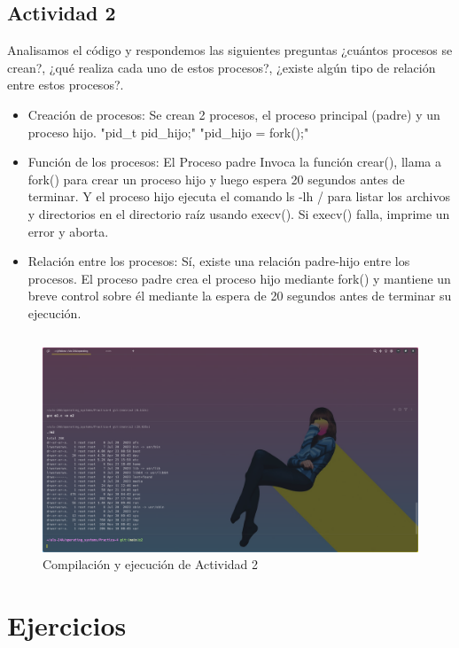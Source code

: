 \documentclass{article}
\newenvironment{code}{\captionsetup{type=listing}}{}
\begin{document}
\subsection{Actividad 2}
Analisamos el código y respondemos las siguientes preguntas ¿cuántos 
procesos se crean?, ¿qué realiza cada uno de estos procesos?, ¿existe 
algún tipo de relación entre estos procesos?.
    \begin{itemize}
        \item Creación de procesos: Se crean 2 procesos, el proceso 
		principal (padre) y un proceso hijo. "pid\_t pid\_hijo;" 
		"pid\_hijo = fork();"
        \item Función de los procesos: El Proceso padre Invoca la 
		función crear(), llama a fork() para crear un proceso hijo 
		y luego espera 20 segundos antes de terminar. Y el proceso 
		hijo ejecuta el comando ls -lh / para listar los archivos 
		y directorios en el directorio raíz usando execv(). Si execv()
		 falla, imprime un error y aborta.
        \item Relación entre los procesos: Sí, existe una relación 
		padre-hijo entre los procesos. El proceso padre crea el 
		proceso hijo mediante fork() y mantiene un breve control 
		sobre él mediante la espera de 20 segundos antes de terminar 
		su ejecución.
	\end{itemize}
	\begin{code}
		\inputminted{c}{../Actividades/e2.c}
	\end{code}
	\begin{figure}[h]
		\caption{Compilación y ejecución de Actividad 2}
		\centering
		\includegraphics[scale=0.3,trim={0 0 20cm 10cm},clip]{act-e2.png}
	\end{figure}

\section{Ejercicios}
\end{document}
